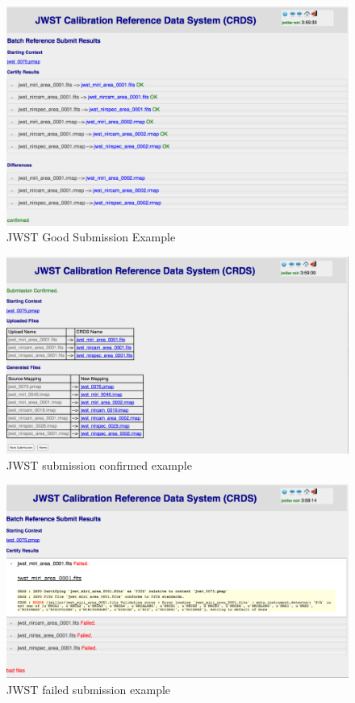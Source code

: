 \documentclass[final,authoryear,5p,times,twocolumn]{elsarticle}
\begin{document}
\begin{figure}[ht!]
\centering
\includegraphics[width=180mm]{JWST_Good_Submission_Review_Page_(after_confirmation).png}
\caption{JWST Good Submission Example}
\label{fig:goodsubmissionreview}
\end{figure}

\begin{figure}[ht!]
\centering
\includegraphics[width=180mm]{JWST_Submission_Confirmed.png}
\caption{JWST submission confirmed example}
\label{fig:confirmedsubmission}
\end{figure}

\begin{figure}[ht!]
\centering
\includegraphics[width=180mm]{JWST_Failed_Submission_DM_schema_violation.png}
\caption{JWST failed submission example\newline\newline}
\label{fig:failedsubmission}
\end{figure}
\end{document}
